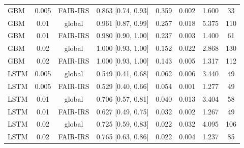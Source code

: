 \documentclass[10pt,onecolumn,letterpaper]{article}
\begin{document}
\begin{table}[!t]
{\begin{tabular}{lccccccc}
GBM & 0.005 & FAIR-IRS & 0.863 [0.74, 0.93] & 0.359 & 0.002 & 1.600 & 33 \\
GBM & 0.01 & global & 0.961 [0.87, 0.99] & 0.257 & 0.018 & 5.375 & 110 \\
GBM & 0.01 & FAIR-IRS & 0.980 [0.90, 1.00] & 0.237 & 0.003 & 1.400 & 61 \\
GBM & 0.02 & global & 1.000 [0.93, 1.00] & 0.152 & 0.022 & 2.868 & 130 \\
GBM & 0.02 & FAIR-IRS & 1.000 [0.93, 1.00] & 0.143 & 0.005 & 1.317 & 112 \\
LSTM & 0.005 & global & 0.549 [0.41, 0.68] & 0.062 & 0.006 & 3.440 & 49 \\
LSTM & 0.005 & FAIR-IRS & 0.529 [0.40, 0.66] & 0.054 & 0.001 & 1.277 & 49 \\
LSTM & 0.01 & global & 0.706 [0.57, 0.81] & 0.040 & 0.013 & 3.404 & 58 \\
LSTM & 0.01 & FAIR-IRS & 0.627 [0.49, 0.75] & 0.032 & 0.002 & 1.267 & 49 \\
LSTM & 0.02 & global & 0.725 [0.59, 0.83] & 0.022 & 0.032 & 4.095 & 106 \\
LSTM & 0.02 & FAIR-IRS & 0.765 [0.63, 0.86] & 0.022 & 0.004 & 1.237 & 85 \\
\bottomrule
\end{tabular}}
\end{table}
\begin{table}[!t]
\caption{Clean Versus Contaminated Training of Unsupervised Detectors (r4.2)\label{tab:s-contam}}
\centering
{}
\end{table}
\end{document}
